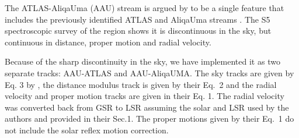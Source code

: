 The ATLAS-AliqaUma (AAU) stream is argued by \citet{Li2021} to be a single feature that includes the previously
identified ATLAS \citep{Koposov2014} and AliqaUma streams \citep{Shipp2018}. The S5 spectroscopic survey of the region
shows it is discontinuous in the sky, but continuous in distance, proper motion and radial velocity.

Because of the sharp discontinuity in the sky, we have implemented it as two separate tracks: AAU-ATLAS and AAU-AliqaUMA.
The sky tracks are given by Eq. 3 by \citet{Li2021}, the distance modulus track is given by their Eq.~2 and the radial velocity and proper motion tracks are given in their Eq. 1. The radial velocity was converted back from GSR to LSR assuming the solar and LSR 
used by the authors and provided in their Sec.1. The proper motions given by their Eq.~1 do not include the solar reflex motion correction.


